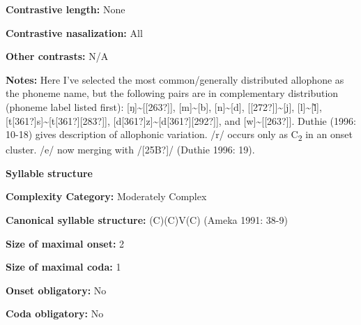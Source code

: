 \begin{styleBody}
\textbf{Contrastive length:} None
\end{styleBody}

\begin{styleBody}
\textbf{Contrastive nasalization:} All
\end{styleBody}

\begin{styleBody}
\textbf{Other contrasts:} N/A
\end{styleBody}

\begin{styleBody}
\textbf{Notes:} Here I’ve selected the most common/generally distributed allophone as the phoneme name, but the following pairs are in complementary distribution (phoneme label listed first): [ŋ]\~{}[[263?]], [m]\~{}[b], [n]\~{}[d], [[272?]]\~{}[j], [l]\~{}[\~{l}], [t[361?]s]\~{}[t[361?][283?]], [d[361?]z]\~{}[d[361?][292?]], and [w]\~{}[[263?]]. Duthie (1996: 10-18) gives description of allophonic variation. /r/ occurs only as C\textsubscript{2} in an onset cluster. /e/ now merging with /[25B?]/ (Duthie 1996: 19).
\end{styleBody}

\begin{styleBody}
\textbf{Syllable structure}
\end{styleBody}

\begin{styleBody}
\textbf{Complexity Category:} Moderately Complex
\end{styleBody}

\begin{styleBody}
\textbf{Canonical syllable structure:} (C)(C)V(C)\textbf{ }(Ameka 1991: 38-9)
\end{styleBody}

\begin{styleBody}
\textbf{Size of maximal onset:} 2
\end{styleBody}

\begin{styleBody}
\textbf{Size of maximal coda:} 1
\end{styleBody}

\begin{styleBody}
\textbf{Onset obligatory:} No
\end{styleBody}

\begin{styleBody}
\textbf{Coda obligatory:} No
\end{styleBody}

